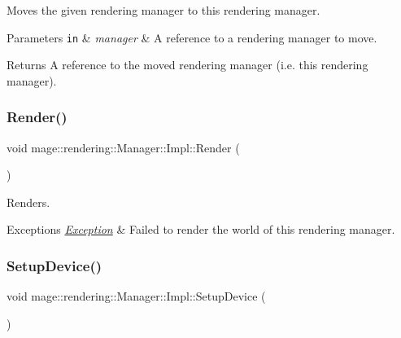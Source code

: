 Moves the given rendering manager to this rendering manager.


\begin{DoxyParams}[1]{Parameters}
\mbox{\tt in}  & {\em manager} & A reference to a rendering manager to move. \\
\hline
\end{DoxyParams}
\begin{DoxyReturn}{Returns}
A reference to the moved rendering manager (i.\+e. this rendering manager). 
\end{DoxyReturn}
\hypertarget{classmage_1_1rendering_1_1_manager_1_1_impl_ac07444036f9accadde15f82f19d6c6ad}{}\label{classmage_1_1rendering_1_1_manager_1_1_impl_ac07444036f9accadde15f82f19d6c6ad} 
\subsubsection{\texorpdfstring{Render()}{Render()}}
{\footnotesize\ttfamily void mage\+::rendering\+::\+Manager\+::\+Impl\+::\+Render (\begin{DoxyParamCaption}{ }\end{DoxyParamCaption})}

Renders.


\begin{DoxyExceptions}{Exceptions}
{\em \hyperlink{classmage_1_1_exception}{Exception}} & Failed to render the world of this rendering manager. \\
\hline
\end{DoxyExceptions}
\hypertarget{classmage_1_1rendering_1_1_manager_1_1_impl_ab5685e722d3d8afa96f30955c2d7c8a6}{}\label{classmage_1_1rendering_1_1_manager_1_1_impl_ab5685e722d3d8afa96f30955c2d7c8a6} 
\subsubsection{\texorpdfstring{Setup\+Device()}{SetupDevice()}}
{\footnotesize\ttfamily void mage\+::rendering\+::\+Manager\+::\+Impl\+::\+Setup\+Device (\begin{DoxyParamCaption}{ }\end{DoxyParamCaption})\hspace{0.3cm}{\ttfamily [private]}}


